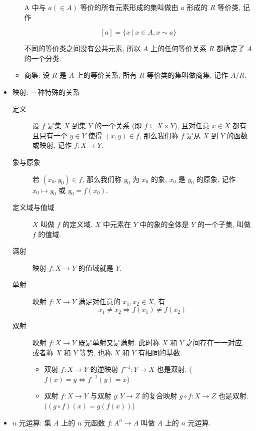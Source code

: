 \documentclass[
    mode=hazy,
    color=blue,
    device=normal,
    lang=cn
]{elegantnote}
\begin{document}
\begin{itemize}
\begin{itemize}
            A 中与 $a(\in A)$ 等价的所有元素形成的集叫做由 $a$ 形成的 $R$ 等价类, 记作

            $$
            [a] = \{x\ \vert\ x\in A, x\sim a\}
            $$

            不同的等价类之间没有公共元素, 所以 $A$ 上的任何等价关系 $R$ 都确定了 $A$ 的一个分类.

            \item 商集: 设 $R$ 是 $A$ 上的等价关系, 所有 $R$ 等价类的集叫做商集, 记作 $A/R$.
        \end{itemize}
        \item 映射: 一种特殊的关系
        \begin{description}
            \item[定义] 设 $f$ 是集 $X$ 到集 $Y$ 的一个关系 (即 $f\subseteq X\times Y$), 且对任意 $ x\in X$ 都有且只有一个 $y\in Y$ 使得 $(x,y)\in f$, 那么我们称 $f$ 是从 $X$ 到 $Y$ 的函数或映射, 记作 $f:X\to Y$.
            \item[象与原象] 若 $(x_0,y_0)\in f$, 那么我们称 $y_0$ 为 $x_0$ 的象, $x_0$ 是 $y_0$ 的原象, 记作 $x_0\mapsto y_0$ 或 $y_0=f(x_0)$.
            \item[定义域与值域] $X$ 叫做 $f$ 的定义域. $X$ 中元素在 $Y$ 中的象的全体是 $Y$ 的一个子集, 叫做 $f$ 的值域.
            \item[满射] 映射 $f:X\to Y$ 的值域就是 $Y$.
            \item[单射] 映射 $f:X\to Y$ 满足对任意的 $x_1, x_2\in X$, 有
            $$
            x_1\neq x_2\Rightarrow f(x_1)\neq f(x_2)
            $$
            \item[双射] 映射 $f:X\to Y$ 既是单射又是满射. 此时称 $X$ 和 $Y$ 之间存在一一对应, 或者称 $X$ 和 $Y$ 等势, 也称 $X$ 和 $Y$ 有相同的基数.
            \begin{itemize}
                \item 双射 $f:X\to Y$ 的逆映射 $f^{-1}:Y\to X$ 也是双射. ($f(x)=y\Leftrightarrow f^{-1}(y) = x$)
                \item 双射 $f:X\to Y$ 与双射 $g:Y\to Z$ 的复合映射 $g\circ f:X\to Z$ 也是双射. ($(g\circ f)(x)=g(f(x))$)
            \end{itemize} 
        \end{description}
        \item $n$ 元运算: 集 $A$ 上的 $n$ 元函数 $f:A^n\to A$ 叫做 $A$ 上的 $n$ 元运算.
    \end{itemize}
\end{document}

